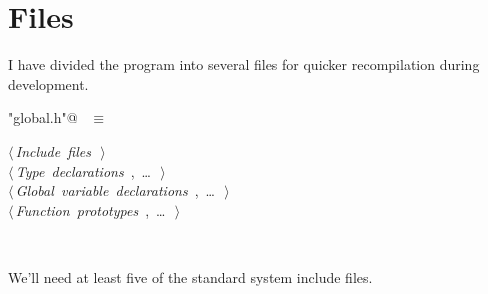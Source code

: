 \documentclass{report}
\begin{document}
\section{Files}

I have divided the program into several files for quicker
recompilation during development.
\begin{flushleft} \small
\begin{minipage}{\linewidth} \label{scrap1}
\verb@"global.h"@\nobreak\ {\footnotesize {} }$\equiv$
\vspace{-1ex}
\begin{list}{}{} \item
\mbox{}\verb@@\hbox{$\langle\,${\it Include files}\nobreak\ {\footnotesize {}}$\,\rangle$}\verb@@\\
\mbox{}\verb@@\hbox{$\langle\,${\it Type declarations}\nobreak\ {\footnotesize {}, \ldots\ }$\,\rangle$}\verb@@\\
\mbox{}\verb@@\hbox{$\langle\,${\it Global variable declarations}\nobreak\ {\footnotesize {}, \ldots\ }$\,\rangle$}\verb@@\\
\mbox{}\verb@@\hbox{$\langle\,${\it Function prototypes}\nobreak\ {\footnotesize {}, \ldots\ }$\,\rangle$}\verb@@\\
\mbox{}\verb@@{\NWsep}
\end{list}
\vspace{-2ex}
\end{minipage}\\[4ex]
\end{flushleft}
We'll need at least five of the standard system include files.
\end{document}
